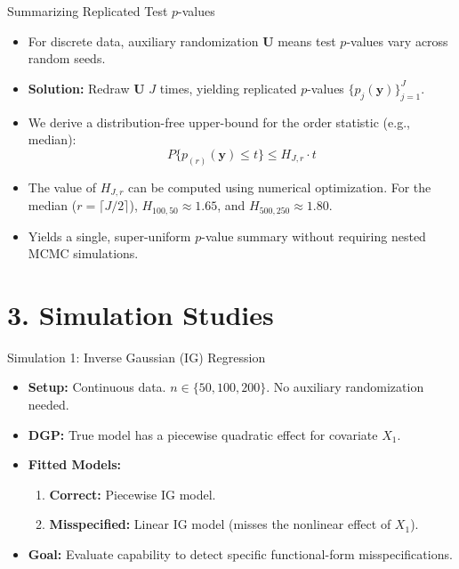 \documentclass[
  ignorenonframetext,
]{beamer}
\providecommand{\tightlist}{%
  \setlength{\itemsep}{0pt}\setlength{\parskip}{0pt}}
\begin{document}
\begin{frame}{Summarizing Replicated Test \(p\)-values}
\protect{}\label{summarizing-replicated-test-p-values}
\begin{itemize}
\tightlist
\item
  For discrete data, auxiliary randomization \(\mathbf{U}\) means test
  \(p\)-values vary across random seeds.
\item
  \textbf{Solution:} Redraw \(\mathbf{U}\) \(J\) times, yielding
  replicated \(p\)-values \(\{p_j(\mathbf{y})\}_{j=1}^J\).
\item
  We derive a distribution-free upper-bound for the order statistic
  (e.g., median):
  \[ P\{p_{(r)}(\mathbf{y}) \le t\} \le H_{J,r} \cdot t \]
\item
  The value of \(H_{J,r}\) can be computed using numerical optimization.
  For the median (\(r=\lceil J/2\rceil\)), \(H_{100,50}\approx 1.65\),
  and \(H_{500,250}\approx 1.80\).
\item
  Yields a single, super-uniform \(p\)-value summary without requiring
  nested MCMC simulations.
\end{itemize}
\end{frame}

\section{3. Simulation Studies}\label{simulation-studies}

\begin{frame}{Simulation 1: Inverse Gaussian (IG) Regression}
\protect{}\label{simulation-1-inverse-gaussian-ig-regression}
\begin{itemize}
\tightlist
\item
  \textbf{Setup:} Continuous data. \(n \in \{50, 100, 200\}\). No
  auxiliary randomization needed.
\item
  \textbf{DGP:} True model has a piecewise quadratic effect for
  covariate \(X_1\).
\item
  \textbf{Fitted Models:}

  \begin{enumerate}
  \tightlist
  \item
    \textbf{Correct:} Piecewise IG model.
  \item
    \textbf{Misspecified:} Linear IG model (misses the nonlinear effect
    of \(X_1\)).
  \end{enumerate}
\item
  \textbf{Goal:} Evaluate capability to detect specific functional-form
  misspecifications.
\end{itemize}
\end{frame}
\end{document}
